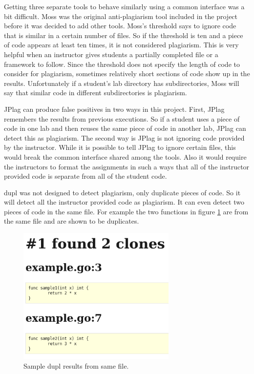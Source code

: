 \documentclass[10pt,journal,compsoc]{IEEEtran}
\begin{document}
	Getting three separate tools to behave similarly using a common interface was a bit difficult. Moss was the original anti-plagiarism tool included in the project before it was decided to add other tools. Moss's threshold says to ignore code that is similar in a certain number of files. So if the threshold is ten and a piece of code appears at least ten times, it is not considered plagiarism. This is very helpful when an instructor gives students a partially completed file or a framework to follow. Since the threshold does not specify the length of code to consider for plagiarism, sometimes relatively short sections of code show up in the results. Unfortunately if a student's lab directory has subdirectories, Moss will say that similar code in different subdirectories is plagiarism.
	
	JPlag can produce false positives in two ways in this project. First, JPlag remembers the results from previous executions. So if a student uses a piece of code in one lab and then reuses the same piece of code in another lab, JPlag can detect this as plagiarism. The second way is JPlag is not ignoring code provided by the instructor. While it is possible to tell JPlag to ignore certain files, this would break the common interface shared among the tools. Also it would require the instructors to format the assignments in such a ways that all of the instructor provided code is separate from all of the student code.
	
	dupl was not designed to detect plagiarism, only duplicate pieces of code. So it will detect all the instructor provided code as plagiarism. It can even detect two pieces of code in the same file. For example the two functions in figure \ref{fig:duplSameFile} are from the same file and are shown to be duplicates.
	
	\begin{figure}[h!]
		\includegraphics[width=0.7\textwidth]{duplSameFile2.png}
		\caption{Sample dupl results from same file.}
		\label{fig:duplSameFile}
	\end{figure}
	
\end{document}
